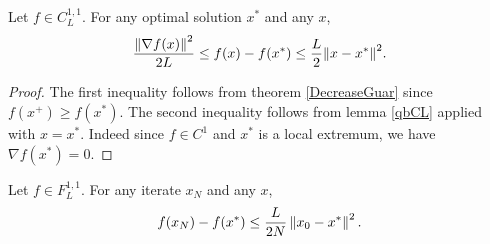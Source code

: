 \begin{lemma}
Let $f \in C_L^{1,1}$. For any optimal solution $x^*$ and any $x$,
\begin{equation*}
\frac{{\left\Vert \nabla f(x) \right\Vert}^2}{2L} \le f(x) - f(x^*) \le \frac{L}{2} {\left\Vert x-x^* \right\Vert}^2 .
\end{equation*}
\end{lemma}
\begin{proof}
The first inequality follows from theorem \ref{DecreaseGuar} since $f(x^+) \ge f(x^*)$. The second inequality follows from lemma \ref{qbCL} applied with $x = x^*$. Indeed since $f \in C^1$ and $x^*$ is a local extremum, we have $\nabla f(x^*) = 0$.
\end{proof}

\begin{theorem}
Let $f \in F_L^{1,1}$. For any iterate $x_N$ and any $x$,
\begin{equation*}
f(x_N) - f(x^*) \le \frac{L}{2N} \left\Vert x_0-x^* \right\Vert^2 .
\end{equation*}
\end{theorem}
